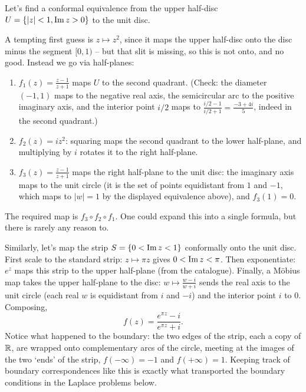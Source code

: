 \documentclass[a4paper]{scrartcl}
\begin{document}
\begin{example}
	Let's find a conformal equivalence from the upper half-disc $U = \{|z| < 1, \operatorname{Im} z > 0\}$ to the unit disc.

	A tempting first guess is $z \mapsto z^2$, since it maps the upper half-disc onto the disc minus the segment $[0, 1)$ -- but that slit is missing, so this is not onto, and no good. Instead we go via half-planes:
	\begin{enumerate}
		\item $f_1(z) = \frac{z - 1}{z + 1}$ maps $U$ to the second quadrant. (Check: the diameter $(-1, 1)$ maps to the negative real axis, the semicircular arc to the positive imaginary axis, and the interior point $i/2$ maps to $\frac{i/2 - 1}{i/2 + 1} = \frac{-3 + 4i}{5}$, indeed in the second quadrant.)
		\item $f_2(z) = iz^2$: squaring maps the second quadrant to the lower half-plane, and multiplying by $i$ rotates it to the right half-plane.
		\item $f_3(z) = \frac{z-1}{z+1}$ maps the right half-plane to the unit disc: the imaginary axis maps to the unit circle (it is the set of points equidistant from $1$ and $-1$, which maps to $|w| = 1$ by the displayed equivalence above), and $f_3(1) = 0$.
	\end{enumerate}
	The required map is $f_3 \circ f_2 \circ f_1$. One could expand this into a single formula, but there is rarely any reason to.
\end{example}

\begin{example}
	Similarly, let's map the strip $S = \{0 < \operatorname{Im} z < 1\}$ conformally onto the unit disc. First scale to the standard strip: $z \mapsto \pi z$ gives $0 < \operatorname{Im} z < \pi$. Then exponentiate: $e^z$ maps this strip to the upper half-plane (from the catalogue). Finally, a M\"obius map takes the upper half-plane to the disc: $w \mapsto \frac{w - i}{w + i}$ sends the real axis to the unit circle (each real $w$ is equidistant from $i$ and $-i$) and the interior point $i$ to $0$. Composing,
	$$
	f(z) = \frac{e^{\pi z} - i}{e^{\pi z} + i}.
	$$
	Notice what happened to the boundary: the two edges of the strip, each a copy of $\mathbb{R}$, are wrapped onto complementary arcs of the circle, meeting at the images of the two `ends' of the strip, $f(-\infty) = -1$ and $f(+\infty) = 1$. Keeping track of boundary correspondences like this is exactly what transported the boundary conditions in the Laplace problems below.
\end{example}
\end{document}
